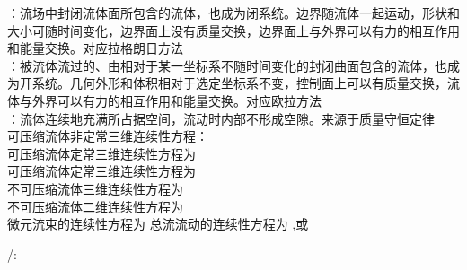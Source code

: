 ：流场中封闭流体面所包含的流体，也成为闭系统。边界随流体一起运动，形状和大小可随时间变化，边界面上没有质量交换，边界面上与外界可以有力的相互作用和能量交换。对应拉格朗日方法\\
：被流体流过的、由相对于某一坐标系不随时间变化的封闭曲面包含的流体，也成为开系统。几何外形和体积相对于选定坐标系不变，控制面上可以有质量交换，流体与外界可以有力的相互作用和能量交换。对应欧拉方法\\
：流体连续地充满所占据空间，流动时内部不形成空隙。来源于质量守恒定律\\
可压缩流体非定常三维连续性方程：\\
可压缩流体定常三维连续性方程为 \\
可压缩流体定常三维连续性方程为 \\
不可压缩流体三维连续性方程为 \\
不可压缩流体二维连续性方程为 \\
微元流束的连续性方程为 
总流流动的连续性方程为 ,或 

\divider


/:

